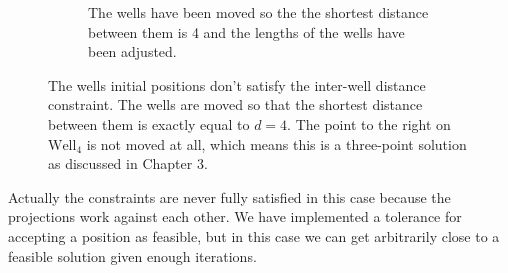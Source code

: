 \begin{figure}[H]
\begin{subfigure}{0.44\textwidth}
		\caption{The wells have been moved so the the shortest distance between them is 4 and
				 the lengths of the wells have been adjusted.}
		\label{fig:alternate_two_b}
	\end{subfigure}%
	\caption{The wells initial positions don't satisfy the inter-well distance constraint. The wells
						are moved so that the shortest distance between them is exactly equal to $d = 4$.
						The point to the right on $\text{Well}_4$ is not moved at all, which means this
						is a three-point solution as discussed in Chapter 3.}
	\label{fig:alternate_two}
\end{figure}
%
Actually the constraints are never fully satisfied in this case because
the projections work against each other. We have implemented a tolerance
for accepting a position as feasible, but in this case we can get arbitrarily
close to a feasible solution given enough iterations.
%

